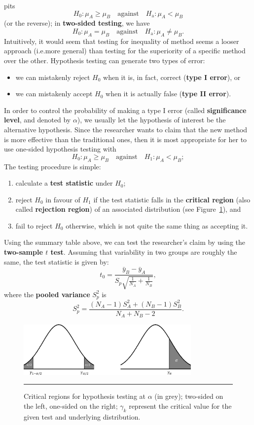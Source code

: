      \afterpage{\FloatBarrier}
pits $$H_{0}: \mu_{A} \geq \mu_{B}\quad\mbox{against}\quad H_{\textrm{a}}: \mu_{A} < \mu_{B}$$ (or the reverse); in \textbf{two-sided testing}, we have $$H_{0}: \mu_{A} = \mu_{B}\quad\mbox{against}\quad H_{\textrm{a}}: \mu_{A} \neq \mu_{B}.$$ Intuitively, it would seem that testing for inequality of method seems a looser approach (i.e.\@ more general) than testing for the superiority of a specific method over the other. 
\newl Hypothesis testing can generate two types of error: 
\begin{itemize}[noitemsep]
\item we can mistakenly reject $H_0$ when it is, in fact, correct (\textbf{type I error}), or 
\item we can mistakenly accept $H_{0}$ when it is actually false (\textbf{type II error}). 
\end{itemize}In order to control the probability of making a type I error (called \textbf{significance level}, and denoted by $\alpha$), we usually let the hypothesis of interest be the alternative hypothesis.
\newl Since the researcher wants to claim that the new method is more effective than the traditional ones, then it is most appropriate for her to use one-sided hypothesis testing with $$H_{0}: \mu_{A} \geq \mu_{B} \quad\mbox{against}\quad H_{1}: \mu_{A} < \mu_{B};$$ The testing procedure is simple:
\begin{enumerate}[noitemsep]
\item calculate a \textbf{test statistic} under $H_0$;
\item reject $H_0$ in favour of $H_1$ if the test statistic falls in the \textbf{critical region} (also called \textbf{rejection region}) of an associated distribution (see Figure~\ref{fig:crit_reg}), and 
\item fail to reject $H_0$ otherwise, which is not quite the same thing as accepting it.
\end{enumerate}
Using the summary table above, we can test the researcher's claim by using the \textbf{two-sample $t$ test}. Assuming that variability in two groups are roughly the same, the test statistic is given by:
$$
    t_{0}=\frac{\bar{y}_{B}-\bar{y}_{A}}{S_{p}\sqrt{\frac{1}{N_{A}}+\frac{1}{N_{B}}}},
$$
where the \textbf{pooled variance} $S^{2}_{p}$ is
$$
    S^{2}_{p}=\frac{(N_{A}-1)S^{2}_{A}+(N_{B}-1)S^{2}_{B}}{N_{A}+N_{B}-2}.
$$
\begin{figure}[t]
\centering
\includegraphics[width=0.8\textwidth]{Images/crit_reg.png}
\caption[\small Critical regions for hypothesis testing]{\small Critical regions for hypothesis testing at $\alpha$ (in grey); two-sided on the left, one-sided on the right; $\gamma_k$ represent the critical value for the given test and underlying distribution. }\label{fig:crit_reg}\hrule
\end{figure}
